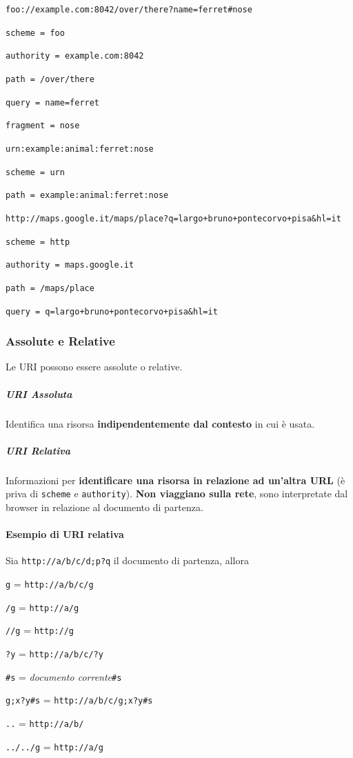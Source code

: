 \documentclass[10pt]{article}
\begin{document}
\begin{list}{}{Esempi:}
\item \texttt{foo://example.com:8042/over/there?name=ferret\#nose}
\begin{list}{}{}
\item \texttt{scheme = foo}
\item \texttt{authority = example.com:8042}
\item \texttt{path = /over/there}
\item \texttt{query = name=ferret}
\item \texttt{fragment = nose}
\end{list}
\item \texttt{urn:example:animal:ferret:nose}
\begin{list}{}{}
\item \texttt{scheme = urn}
\item \texttt{path = example:animal:ferret:nose}
\end{list}
\item \texttt{http://maps.google.it/maps/place?q=largo+bruno+pontecorvo+pisa\&hl=it}
\begin{list}{}{}
\item \texttt{scheme = http}
\item \texttt{authority = maps.google.it}
\item \texttt{path = /maps/place}
\item \texttt{query = q=largo+bruno+pontecorvo+pisa\&hl=it}
\end{list}
\end{list}
\subsubsection{Assolute e Relative}
Le URI possono essere assolute o relative.
\subparagraph{URI Assoluta} Identifica una risorsa \textbf{indipendentemente dal contesto} in cui è usata.
\subparagraph{URI Relativa} Informazioni per \textbf{identificare una risorsa in relazione ad un'altra URL} (è priva di \texttt{scheme} e \texttt{authority}). \textbf{Non viaggiano sulla rete}, sono interpretate dal browser in relazione al documento di partenza.
\pagebreak
\paragraph{Esempio di URI relativa}
Sia \texttt{http://a/b/c/d;p?q} il documento di partenza, allora
\begin{list}{}{}
\item \texttt{g} = \texttt{http://a/b/c/g}
\item \texttt{/g} = \texttt{http://a/g}
\item \texttt{//g} = \texttt{http://g}
\item \texttt{?y} = \texttt{http://a/b/c/?y}
\item \texttt{\#s} = \textit{documento corrente}\texttt{\#s}
\item \texttt{g;x?y\#s} = \texttt{http://a/b/c/g;x?y\#s}
\item \texttt{..} = \texttt{http://a/b/}
\item \texttt{../../g} = \texttt{http://a/g}
\end{list}
\end{document}
